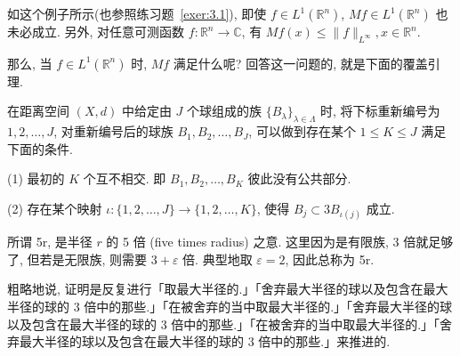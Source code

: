 如这个例子所示(也参照练习题~\ref{exer:3.1}), 即使 $f \in L^{1}(\mathbb{R}^{n})$, $Mf \in L^{1}(\mathbb{R}^{n})$ 也未必成立. 另外, 对任意可测函数 $f: \mathbb{R}^{n} \to \mathbb{C}$, 有 $Mf(x) \leq \|f\|_{L^{\infty}}, x \in \mathbb{R}^{n}$.

那么, 当 $f \in L^{1}(\mathbb{R}^{n})$ 时, $Mf$ 满足什么呢? 回答这一问题的, 就是下面的覆盖引理.

\begin{theorem}[5r-覆盖引理]\label{thm:3.1}
在距离空间 $(X,d)$ 中给定由 $J$ 个球组成的族 $\{B_{\lambda}\}_{\lambda \in \Lambda}$ 时, 将下标重新编号为 $1, 2, \ldots, J$, 对重新编号后的球族 $B_{1}, B_{2}, \ldots, B_{J}$, 可以做到存在某个 $1 \leq K \leq J$ 满足下面的条件.

(1) 最初的 $K$ 个互不相交. 即 $B_{1}, B_{2}, \ldots, B_{K}$ 彼此没有公共部分.

(2) 存在某个映射 $\iota: \{1, 2, \ldots, J\} \to \{1, 2, \ldots, K\}$, 使得 $B_{j} \subset 3B_{\iota(j)}$ 成立.
\end{theorem}

\begin{note}\label{note:3.1}
所谓 5r, 是半径 $r$ 的 5 倍 (five times radius) 之意. 这里因为是有限族, 3 倍就足够了, 但若是无限族, 则需要 $3 + \varepsilon$ 倍. 典型地取 $\varepsilon = 2$, 因此总称为 5r.
\end{note}

粗略地说, 证明是反复进行「取最大半径的.」「舍弃最大半径的球以及包含在最大半径的球的 3 倍中的那些.」「在被舍弃的当中取最大半径的.」「舍弃最大半径的球以及包含在最大半径的球的 3 倍中的那些.」「在被舍弃的当中取最大半径的.」「舍弃最大半径的球以及包含在最大半径的球的 3 倍中的那些.」来推进的.

